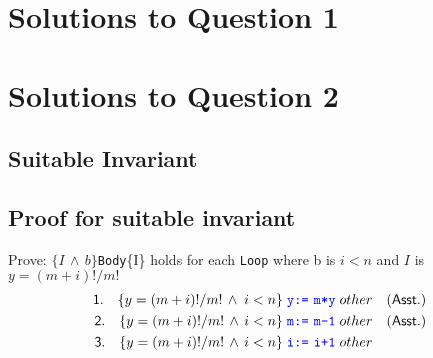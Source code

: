 \documentclass[a4paper,12pt]{article}
\begin{document}
\section{Solutions to Question 1}
% 

\section{Solutions to Question 2}
\subsection{Suitable Invariant}

\subsection{Proof for suitable invariant}
Prove: $\{I\,\land\,b\}$\;\texttt{Body}\;\{I\} holds for each \texttt{Loop} where b is $i < n$ and $I$ is $y=(m+i)!/m!$
\begin{align*}
\mathsf{1.}\quad \{y = (m+i)!/m!\,\land\;i < n\}\;\texttt{\textcolor{blue}{y:=\! m*y}}\;{other} && \mathsf{(Asst.)} \\
\mathsf{2.}\quad \{y = (m+i)!/m!\,\land\,i < n\}\;\texttt{\textcolor{blue}{m:=\! m-1}}\;{other} && \mathsf{(Asst.)} \\
\mathsf{3.}\quad \{y = (m+i)!/m!\,\land\,i < n\}\;\texttt{\textcolor{blue}{i:=\! i+1}}\;{other}
\end{align*}
\end{document}
